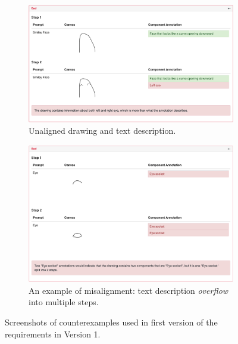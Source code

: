 \begin{figure}[!htb]
\ContinuedFloat
\begin{subfigure}{\textwidth}
    \centering
    \includegraphics[width=.8\linewidth]{data_collection/v1_requirement1_bad1.png}  
    \caption{Unaligned drawing and text description.}
    \label{v1.requirement_1.2}
\end{subfigure}
\newline
\begin{subfigure}{\textwidth}
    \centering
    \includegraphics[width=.8\linewidth]{data_collection/v1_requirement1_bad2.png}  
    \caption{An example of misalignment: text description \textit{overflow} into multiple steps.}
    \label{v1.requirement_1.3}
\end{subfigure}
\caption{Screenshots of counterexamples used in first version of the requirements in Version 1.}
\label{v1.requirement_1}
\end{figure}


